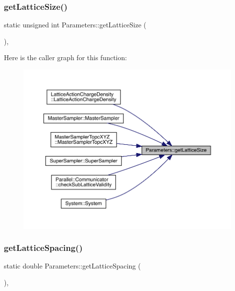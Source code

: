 \subsubsection{\texorpdfstring{getLatticeSize()}{getLatticeSize()}}
{\footnotesize\ttfamily static unsigned int Parameters\+::get\+Lattice\+Size (\begin{DoxyParamCaption}{ }\end{DoxyParamCaption})\hspace{0.3cm}{\ttfamily [inline]}, {\ttfamily [static]}}

Here is the caller graph for this function\+:\nopagebreak
\begin{figure}[H]
\begin{center}
\leavevmode
\includegraphics[width=350pt]{class_parameters_a128ccc4cb31e9930a825cfd3b8e83d2e_icgraph}
\end{center}
\end{figure}
\mbox{\label{class_parameters_aabe7e3a2468cf11bb5e98e626cb94ff2}} 
\subsubsection{\texorpdfstring{getLatticeSpacing()}{getLatticeSpacing()}}
{\footnotesize\ttfamily static double Parameters\+::get\+Lattice\+Spacing (\begin{DoxyParamCaption}{ }\end{DoxyParamCaption})\hspace{0.3cm}{\ttfamily [inline]}, {\ttfamily [static]}}

